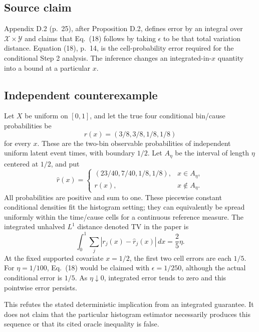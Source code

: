\documentclass[10pt]{article}
\begin{document}
\subsection*{Source claim}
Appendix D.2 (p. 25), after Proposition D.2, defines error by an integral over \(\mathcal X\times\mathcal Y\) and claims that Eq. (18) follows by taking \(\epsilon\) to be that total variation distance. Equation (18), p. 14, is the cell-probability error required for the conditional Step 2 analysis. The inference changes an integrated-in-\(x\) quantity into a bound at a particular \(x\).\par
\subsection*{Independent counterexample}
Let \(X\) be uniform on \([0,1]\), and let the true four conditional bin/cause probabilities be \[r(x)=(3/8,3/8,1/8,1/8)\] for every \(x\). These are the two-bin observable probabilities of independent uniform latent event times, with boundary \(1/2\). Let \(A_\eta\) be the interval of length \(\eta\) centered at \(1/2\), and put \[\widehat r(x)=
 \begin{cases}
 (23/40,7/40,1/8,1/8),&x\in A_\eta,\\
 r(x),&x\notin A_\eta.
 \end{cases}\] All probabilities are positive and sum to one. These piecewise constant conditional densities fit the histogram setting; they can equivalently be spread uniformly within the time/cause cells for a continuous reference measure. The integrated unhalved \(L^1\) distance denoted TV in the paper is \[\int_0^1\sum_j|r_j(x)-\widehat r_j(x)|\,dx=\frac25\eta.\] At the fixed supported covariate \(x=1/2\), the first two cell errors are each \(1/5\). For \(\eta=1/100\), Eq. (18) would be claimed with \(\epsilon=1/250\), although the actual conditional error is \(1/5\). As \(\eta\downarrow0\), integrated error tends to zero and this pointwise error persists.\par
This refutes the stated deterministic implication from an integrated guarantee. It does not claim that the particular histogram estimator necessarily produces this sequence or that its cited oracle inequality is false.\par
\end{document}
